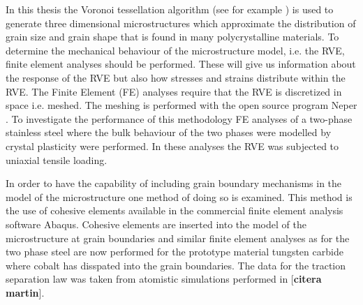 \documentclass[introduction.tex]{subfiles}
\begin{document}
In this thesis the Voronoi tessellation algorithm (see for example \cite{voro}) is used to generate three dimensional microstructures which approximate the distribution of grain size and grain shape that is found in many polycrystalline materials. To determine the mechanical behaviour of the microstructure model, i.e. the RVE, finite element analyses should be performed. These will give us information about the response of the RVE but also how stresses and strains distribute within the RVE. The Finite Element (FE) analyses require that the RVE is discretized in space i.e. meshed. The meshing is performed with the open source program Neper \cite{Quey20111729}.  To investigate the performance of this methodology FE analyses of a two-phase stainless steel where the bulk behaviour of the two phases were modelled by crystal plasticity were performed. In these analyses the RVE was subjected to uniaxial tensile loading.

In order to have the capability of including grain boundary mechanisms in the model of the microstructure one method of doing so is examined. This method is the use of cohesive elements available in the commercial finite element analysis software Abaqus. Cohesive elements are inserted into the model of the microstructure at grain boundaries and similar finite element analyses as for the two phase steel are now performed for the prototype material tungsten carbide where cobalt has disspated into the grain boundaries. The data for the traction separation law was taken from atomistic simulations performed in [\textbf{citera martin}].
\end{document}
